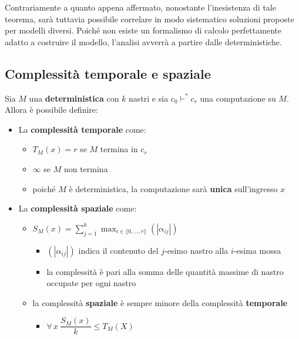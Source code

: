 \documentclass[italian, 10pt]{article}
\begin{document}
Contrariamente a quanto appena affermato, nonostante l'inesistenza di tale teorema, sarà tuttavia possibile correlare in modo sistematico soluzioni proposte per modelli diversi.
Poiché non esiste un formalismo di calcolo perfettamente adatto a costruire il modello, l'analisi avverrà a partire dalle \TM deterministiche.

\subsection{Complessità temporale e spaziale}

Sia \(M\) una \TM \textbf{deterministica} con \(k\) nastri e sia \(c_0 \vdash^\ast c_r\) una computazione su \(M\).
Allora è possibile definire:

\begin{itemize}
  \item La \textbf{complessità temporale} come:
        \begin{itemize}
          \item \(T_M(x) = r\) se \(M\) termina in \(c_r\)
          \item \(\infty\) se \(M\) non termina
          \item poiché \(M\) è deterministica, la computazione sarà \textbf{unica} sull'ingresso \(x\)
        \end{itemize}
  \item La \textbf{complessità spaziale} come:
        \begin{itemize}
          \item \(\displaystyle S_M(x) = \sum^k_{j=1} \max_{i \in \{0, \ldots, r\}} \left(|\alpha_{ij}|\right)\)
                \begin{itemize}[label=\(\rightarrow\)]
                  \item \(\left(|\alpha_{ij}|\right)\) indica il contenuto del \(j\)-esimo nastro alla \(i\)-esima mossa
                  \item la complessità è pari alla somma delle quantità massime di nastro occupate per ogni nastro
                \end{itemize}
          \item la complessità \textbf{spaziale} è sempre minore della complessità \textbf{temporale}
                \begin{itemize}[label=\(\rightarrow\)]
                  \item \(\forall \, x \ \dfrac{S_M(x)}{k} \leq T_M(X)\)
                \end{itemize}
        \end{itemize}
\end{itemize}
\end{document}
